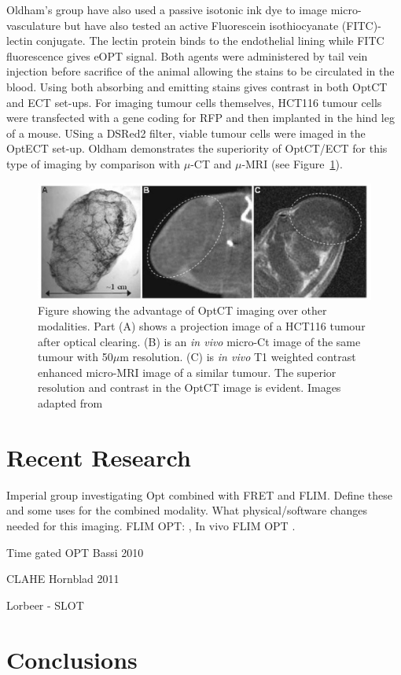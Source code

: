 \documentclass[12pt]{article}
\begin{document}
Oldham's group have also used a passive isotonic ink dye to image micro-vasculature but have also tested an active  Fluorescein isothiocyanate (FITC)-lectin conjugate. The lectin protein binds to the endothelial lining while FITC fluorescence gives eOPT signal. \cite{Oldham:2007ku} Both agents were administered by tail vein injection before sacrifice of the animal allowing the stains to be circulated in the blood. Using both absorbing and emitting stains gives contrast in both OptCT and ECT set-ups. For imaging tumour cells themselves, HCT116 tumour cells were transfected with a gene coding for RFP and then implanted in the hind leg of a mouse. \cite{Oldham:2006} USing a DSRed2 filter, viable tumour cells were imaged in the OptECT set-up. Oldham demonstrates the superiority of OptCT/ECT for this type of imaging by comparison with $\mu$-CT and $\mu$-MRI (see Figure~\ref{fig:tumourstaining}).



\begin{figure}[H]
\centering
\includegraphics[scale=1]{Oldham_2006_tumourstaining.jpg}
\caption{Figure showing the advantage of OptCT imaging over other modalities. Part (A) shows a projection image of a HCT116 tumour after optical clearing. (B) is an \textit{in vivo} micro-Ct image of the same tumour with 50$\mu$m resolution. (C) is \textit{in vivo} T1 weighted contrast enhanced micro-MRI image of a similar tumour. The superior resolution and contrast in the OptCT image is evident. Images  adapted from \cite{Oldham:2006}}
\label{fig:tumourstaining}
\end{figure}









\section{Recent Research}

Imperial group investigating Opt combined with FRET and FLIM. Define these and some uses for the combined modality. What physical/software changes needed for this imaging.
FLIM OPT: \cite{McGinty:2008ix}, In vivo FLIM OPT \cite{McGinty:2011vm}.

 Time gated OPT Bassi 2010 \cite{Bassi:2010}
 
 CLAHE Hornblad 2011 \cite{Hornblad:2011fh}

Lorbeer - SLOT \cite{Lorbeer:2011}

\section{Conclusions}


\end{document}
